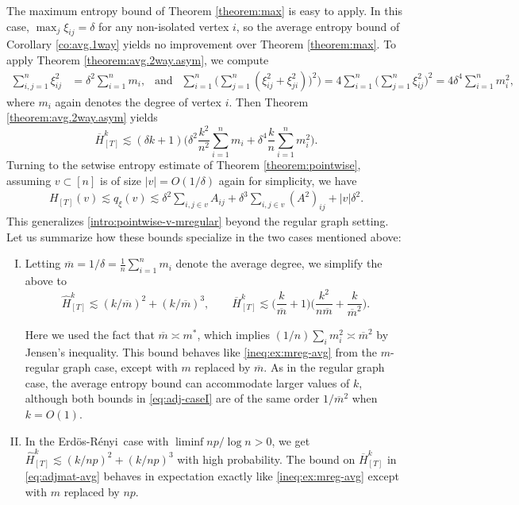 \documentclass[11pt,reqno]{amsart}
\numberwithin{equation}{section}
\theoremstyle{definition}
\newcommand{\Erdos}{Erd\"{o}s-R\'enyi}
\begin{document}
The maximum entropy bound of Theorem \ref{theorem:max} is easy to apply. In this case, $\max_j \xi_{ij} = \delta$ for any non-isolated vertex $i$, so the average entropy bound of Corollary \ref{co:avg.1way} yields no improvement over Theorem \ref{theorem:max}.
To apply 
Theorem \ref{theorem:avg.2way.asym}, we compute 
\begin{align*}
\sum_{i,j=1}^n\xi_{ij}^2 &= \delta^2 \sum_{i=1}^nm_i, \ \ \text{ and } \ \ 
 \sum_{i=1}^n\bigg(\sum_{j=1}^n (\xi_{ij}^2 +\xi_{ji}^2)\bigg)^2\bigg) = 4\sum_{i=1}^n\bigg(\sum_{j=1}^n \xi_{ij}^2\bigg)^2 =  4\delta^4\sum_{i =1}^nm_i^2,
\end{align*}
where $m_i$ again denotes the degree of vertex $i$. Then Theorem \ref{theorem:avg.2way.asym} yields
\begin{equation}
\overline{H}^k_{[T]} \lesssim (\delta k + 1)\bigg(  \delta^2 \frac{k^2}{n^2}      \sum_{i=1}^nm_i + \delta^4\frac{  k}{n }\sum_{i =1}^nm_i^2 \bigg). \label{eq:adjmat-avg}
\end{equation}
Turning to the setwise entropy estimate of Theorem \ref{theorem:pointwise}, assuming $v \subset [n]$ is of size $|v| = O(1/\delta)$ again for simplicity, we have
\begin{align*}
H_{[T]}(v) \lesssim q_\xi(v) \lesssim \delta^2 \sum_{i,j \in v}A_{ij} + \delta^3 \sum_{i,j \in v}(A^2)_{ij} + |v|\delta^2.
\end{align*}
This generalizes \eqref{intro:pointwise-v-mregular} beyond the regular graph setting. Let us summarize how these bounds specialize in the two  cases mentioned above:
\begin{enumerate}[(I)]
\item Letting $\overline{m}=1/\delta=\frac{1}{n}\sum_{i=1}^n m_i$ denote the average degree, we simplify the above to 
\begin{equation} \label{eq:adj-caseI}
\widehat{H}^k_{[T]}  \lesssim (k/ \overline{m})^2 + (k/ \overline{m})^3, \qquad \overline{H}^k_{[T]}  \lesssim \bigg(  \frac{k}{\overline{m}}+1\bigg)\bigg(\frac{k^2}{n\overline{m}} +  \frac{k}{\overline{m}^2} \bigg) . 
\end{equation}

Here we used the fact that $\overline{m} \asymp m^*$, which implies $(1/n)\sum_i m_i^2 \asymp \overline{m}^2$ by Jensen's inequality. This bound behaves like \eqref{ineq:ex:mreg-avg} from the $m$-regular graph case, except with $m$ replaced by $\overline{m}$.  
As in the regular graph case, the average entropy bound can accommodate larger values of $k$, although both bounds in \eqref{eq:adj-caseI} are of the same order $1/\overline{m}^2$ when $k=O(1)$. 
\item In the \Erdos\ case with $\liminf np/\log n > 0$, we get $\widehat{H}^k_{[T]} \lesssim (k/np)^2 + (k/np)^3$ with high probability. The bound on $\overline{H}^k_{[T]}$ in \eqref{eq:adjmat-avg}  behaves in expectation exactly like \eqref{ineq:ex:mreg-avg} except with $m$ replaced by $np$. 
\end{enumerate}
\end{document}
